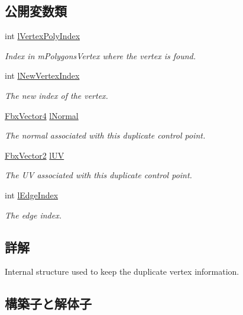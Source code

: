 \subsection*{公開変数類}
\begin{DoxyCompactItemize}
\item 
int \hyperlink{class_fbx_mesh_1_1_duplicate_vertex_afe223b4087156f6779fc5883dc56332c}{l\+Vertex\+Poly\+Index}
\begin{DoxyCompactList}\small\item\em Index in m\+Polygons\+Vertex where the vertex is found. \end{DoxyCompactList}\item 
int \hyperlink{class_fbx_mesh_1_1_duplicate_vertex_a0e9792d44731dde65ead70a148dd478e}{l\+New\+Vertex\+Index}
\begin{DoxyCompactList}\small\item\em The new index of the vertex. \end{DoxyCompactList}\item 
\hyperlink{class_fbx_vector4}{Fbx\+Vector4} \hyperlink{class_fbx_mesh_1_1_duplicate_vertex_ad8fcfba1eaea34a1090eeb78c0f18b4f}{l\+Normal}
\begin{DoxyCompactList}\small\item\em The normal associated with this duplicate control point. \end{DoxyCompactList}\item 
\hyperlink{class_fbx_vector2}{Fbx\+Vector2} \hyperlink{class_fbx_mesh_1_1_duplicate_vertex_a8788aaa86c459f069d1f90bd27acbee0}{l\+UV}
\begin{DoxyCompactList}\small\item\em The UV associated with this duplicate control point. \end{DoxyCompactList}\item 
int \hyperlink{class_fbx_mesh_1_1_duplicate_vertex_aae381ae0863a047fa1e9bd081f137076}{l\+Edge\+Index}
\begin{DoxyCompactList}\small\item\em The edge index. \end{DoxyCompactList}\end{DoxyCompactItemize}


\subsection{詳解}
Internal structure used to keep the duplicate vertex information. 

\subsection{構築子と解体子}
\mbox{\label{class_fbx_mesh_1_1_duplicate_vertex_ab282bd63e5da364fa288e90b1590d0bc}} 
